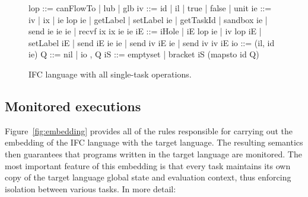 \begin{figure}
\begin{code}
lop  ::=  canFlowTo | lub | glb
iv   ::=  id | il | true | false | unit
ie   ::=  iv | ix | ie lop ie | getLabel | setLabel ie | getTaskId
       |  sandbox ie | send ie ie ie | recvf ix ix ie ie
iE   ::=  iHole | iE lop ie | iv lop iE | setLabel iE
       |  send iE ie ie | send iv iE ie | send iv iv iE
io   ::=  (il, id ie)
Q    ::=  nil | io , Q
iS   ::=  emptyset | bracket iS (mapsto id Q)
\end{code}

\caption{IFC language with all single-task operations.}
\label{fig:ifc}
\end{figure}

\subsection{Monitored executions}
Figure~\ref{fig:embedding} provides all of the rules responsible for %
carrying out the embedding of the IFC language with the target language. The
resulting semantics then guarantees that programs written in the target language are
monitored. The most important feature of this embedding is that every task
maintains its own copy of the target language global state and evaluation
context, thus enforcing isolation between various tasks.  In more detail:

